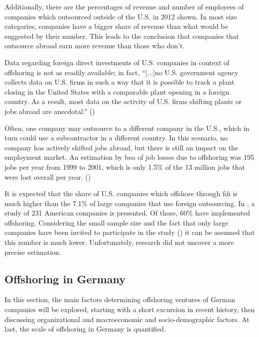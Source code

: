Additionally, there are the percentages of revenue and number of employees of companies which outsourced outside of the U.S. in 2012 shown. In most size categories, companies have a bigger share of revenue than what would be suggested by their number. This leads to the conclusion that companies that outsource abroad earn more revenue than those who don't.


Data regarding foreign direct investments of U.S. companies in context of offshoring is not as readily available; in fact, ``[...]no U.S. government agency collects data on U.S. firms in such a way that it is possible to track a plant closing in the United States with a comparable plant opening in a foreign country. As a result, most data on the activity of U.S. firms shifting plants or jobs abroad are anecdotal.'' (\cite{Jackson.2013})


 Often, one company may outsource to a different company in the U.S., which in turn could use a subcontractor in a different country. In this scenario, no company has actively shifted jobs abroad, but there is still an impact on the employment market. An estimation by \gls{bea} of job losses due to offshoring was 195  jobs per year from 1999 to 2001, which is only 1.5\% of the 13 million jobs that were lost overall per year. (\cite[pp. 14ff]{Kozlow.2006})

It is expected that the share of U.S. companies which offshore through \gls{fdi} is much higher than the 7.1\% of large companies that use foreign outsourcing. In \cite[pp. 167ff]{Hutzschenreuter.2007}, a study of 231 American companies is presented. Of those, 60\% have implemented offshoring. Considering the small sample size and the fact that only large companies have been invited to participate in the study (\cite[pp. 199f]{Hutzschenreuter.2007}) it can be assumed that this number is much lower. Unfortunately, research did not uncover a more precise estimation.

\subsection{Offshoring in Germany}
\label{sec:OffshoringGER}
In this section, the main factors determining offshoring ventures of German companies will be explored, starting with a short excursion in recent history, then discussing organizational and macroeconomic and socio-demographic factors. At last, the scale of offshoring in Germany is quantified.

